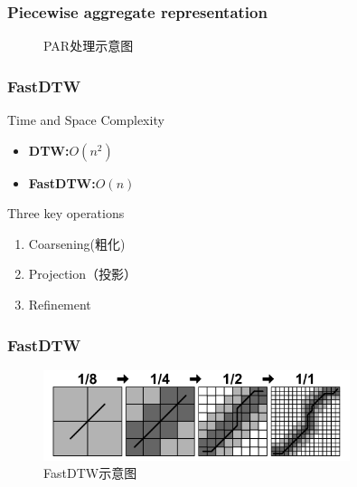 \documentclass[xetex,mathserif,serif]{beamer}
\begin{document}
\begin{frame}
\frametitle{Piecewise aggregate representation}
\begin{figure}
    \centering
    \caption{PAR处理示意图} \label{fig:6}
\end{figure}
\end{frame}

\begin{frame}
\frametitle{FastDTW}
\begin{block}{Time and Space Complexity}
\begin{itemize}
  \item \textbf{DTW:}$O(n^2)$
  \item \textbf{FastDTW:}$O(n)$
\end{itemize}
\end{block}

\begin{exampleblock}{Three key operations}
\begin{enumerate}
  \item Coarsening(粗化)
  \item Projection（投影）
  \item Refinement
\end{enumerate}
\end{exampleblock}
\end{frame}

\begin{frame}
\frametitle{FastDTW}
\begin{figure}
  \centering
  \includegraphics[width=0.8\textwidth]{FastDTW.png}
  \caption{FastDTW示意图}\label{fig:7}
\end{figure}
\end{frame}
\end{document}
